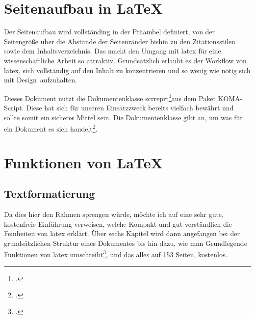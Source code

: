 \newpage

\section{Seitenaufbau in LaTeX}
\label{sec:seit-aufbau}
Der Seitenaufbau wird vollständing in der Präambel definiert, von der Seitengröße über die Abstände der Seitenränder bishin zu den Zitationsstilen sowie dem Inhaltsverzeichnis. Das macht den Umgang mit \gls{latex} für eine wissenschaftliche Arbeit so attraktiv. Grundsätzlich erlaubt es der Workflow von \gls{latex}, sich vollständig auf den Inhalt zu konzentrieren und so wenig wie nötig sich mit \glqq Design\grqq\ aufzuhalten.

Dieses Dokument nutzt die Dokumentenklasse \glqq scrreprt\footcite[S. 51]{kohmKOMA2019}\grqq aus dem Paket KOMA-Script. Diese hat sich für unseren Einsatzzweck bereits vielfach bewährt und sollte somit ein sicheres Mittel sein. Die Dokumentenklasse gibt an, um was für ein Dokument es sich handelt\footcite[Vgl. ][S. 9]{oetikerIntroductionLATEX2e2018}.

\section{Funktionen von LaTeX}
\label{sec:funkt-von}
\subsection{Textformatierung}
\label{sec:textformat}
Da dies hier den Rahmen sprengen würde, möchte ich auf eine sehr gute, kostenfreie Einführung verweisen, welche Kompakt und gut verständlich die Feinheiten von \gls{latex} erklärt. Über sechs Kapitel wird dann angefangen bei der grundsätzlichen Struktur eines Dokumentes bis hin dazu, wie man Grundlegende Funktionen von \gls{latex} umschreibt\footcite{oetikerIntroductionLATEX2e2018}, und das alles auf 153 Seiten, kostenlos.

\begin{table}[htbp]
  \caption{Grundlegende Textformatierung}
  \label{tab:textformat}
\end{table}

